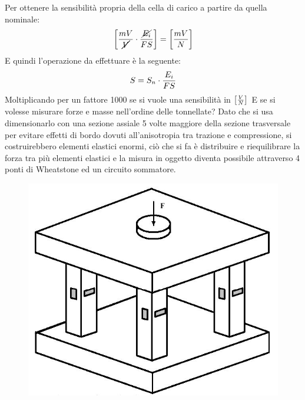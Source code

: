 \documentclass[a4paper, 15pt]{article}
\begin{document}
\begin{adjustwidth}{2in}{}
	 	Per ottenere la sensibilità propria della cella di carico a partire da quella nominale: 
	 	\[ \left[{mV\over \cancel{V}}\cdot{\cancel{E_i}\over FS}\right] = \left[mV\over N\right] \]
	 	E quindi l'operazione da effettuare è la seguente: 
	 	\[ S = S_n\cdot {E_i\over FS}\]
	 	Moltiplicando per un fattore 1000 se si vuole una sensibilità in \(\left[V\over N\right]\)
	 	E se si volesse misurare forze e masse nell'ordine delle tonnellate? Dato che si usa dimensionarlo con una sezione assiale 5 volte maggiore della sezione trasversale per evitare effetti di bordo dovuti all'anisotropia tra trazione e compressione, si costruirebbero elementi elastici enormi, ciò che si fa è distribuire e riequilibrare la forza tra più elementi elastici e la misura in oggetto diventa possibile attraverso 4 ponti di Wheatstone ed un circuito sommatore. 
\begin{figure}[H]
	\centering
	\includegraphics[width=0.2\linewidth]{immagini/12}
	\label{fig:12}
\end{figure}
\end{adjustwidth}
\end{document}
